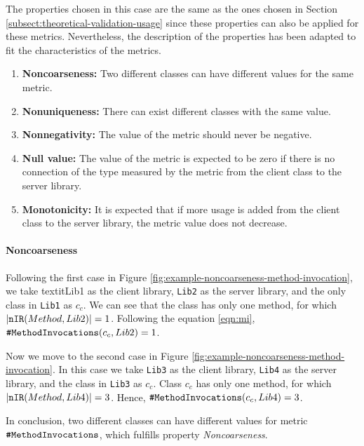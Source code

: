 The properties chosen in this case are the same as the ones chosen in Section \ref{subsect:theoretical-validation-usage} since these properties can also be applied for these metrics. Nevertheless, the description of the properties has been adapted to fit the characteristics of the metrics.

\begin{enumerate}
  \item \textbf{Noncoarseness:} Two different classes can have different values for the same metric.
  \item \textbf{Nonuniqueness:} There can exist different classes with the same value.
  \item \textbf{Nonnegativity:} The value of the metric should never be negative.
  \item \textbf{Null value:} The value of the metric is expected to be zero if there is no connection of the type measured by the metric from the client class to the server library.
  \item \textbf{Monotonicity:} It is expected that if more usage is added from the client class to the server library, the metric value does not decrease.
\end{enumerate}

\paragraph{Noncoarseness}
Following the first case in Figure \ref{fig:example-noncoarseness-method-invocation}, we take textit{Lib1} as the client library, \texttt{Lib2} as the server library, and the only class in \texttt{Lib1} as $c_c$. We can see that the class has only one method, for which $|\verb|nIR|(Method, Lib2)| = 1$. Following the equation \ref{eqn:mi}, $\verb|#MethodInvocations|(c_c, Lib2) = 1$.

Now we move to the second case in Figure \ref{fig:example-noncoarseness-method-invocation}. In this case we take \texttt{Lib3} as the client library, \texttt{Lib4} as the server library, and the class in \texttt{Lib3} as $c_c$. Class $c_c$ has only one method, for which $|\verb|nIR|(Method, Lib4)| = 3$. Hence, $\verb|#MethodInvocations|(c_c, Lib4) = 3$.

In conclusion, two different classes can have different values for metric $\verb|#MethodInvocations|$, which fulfills property \textit{Noncoarseness}.

